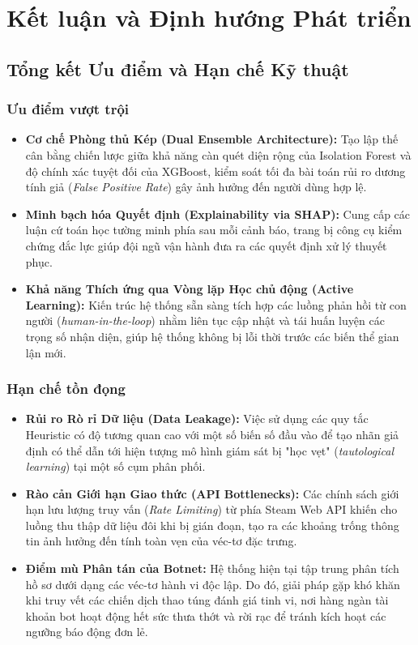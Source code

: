 \section{Kết luận và Định hướng Phát triển}

\subsection{Tổng kết Ưu điểm và Hạn chế Kỹ thuật}

\subsubsection{Ưu điểm vượt trội}
\begin{itemize}
    \item \textbf{Cơ chế Phòng thủ Kép (Dual Ensemble Architecture):} Tạo lập thế cân bằng chiến lược giữa khả năng càn quét diện rộng của Isolation Forest và độ chính xác tuyệt đối của XGBoost, kiểm soát tối đa bài toán rủi ro dương tính giả (\textit{False Positive Rate}) gây ảnh hưởng đến người dùng hợp lệ.
    \item \textbf{Minh bạch hóa Quyết định (Explainability via SHAP):} Cung cấp các luận cứ toán học tường minh phía sau mỗi cảnh báo, trang bị công cụ kiểm chứng đắc lực giúp đội ngũ vận hành đưa ra các quyết định xử lý thuyết phục.
    \item \textbf{Khả năng Thích ứng qua Vòng lặp Học chủ động (Active Learning):} Kiến trúc hệ thống sẵn sàng tích hợp các luồng phản hồi từ con người (\textit{human-in-the-loop}) nhằm liên tục cập nhật và tái huấn luyện các trọng số nhận diện, giúp hệ thống không bị lỗi thời trước các biến thể gian lận mới.
\end{itemize}

\subsubsection{Hạn chế tồn đọng}
\begin{itemize}
    \item \textbf{Rủi ro Rò rỉ Dữ liệu (Data Leakage):} Việc sử dụng các quy tắc Heuristic có độ tương quan cao với một số biến số đầu vào để tạo nhãn giả định có thể dẫn tới hiện tượng mô hình giám sát bị "học vẹt" (\textit{tautological learning}) tại một số cụm phân phối.
    \item \textbf{Rào cản Giới hạn Giao thức (API Bottlenecks):} Các chính sách giới hạn lưu lượng truy vấn (\textit{Rate Limiting}) từ phía Steam Web API khiến cho luồng thu thập dữ liệu đôi khi bị gián đoạn, tạo ra các khoảng trống thông tin ảnh hưởng đến tính toàn vẹn của véc-tơ đặc trưng.
    \item \textbf{Điểm mù Phân tán của Botnet:} Hệ thống hiện tại tập trung phân tích hồ sơ dưới dạng các véc-tơ hành vi độc lập. Do đó, giải pháp gặp khó khăn khi truy vết các chiến dịch thao túng đánh giá tinh vi, nơi hàng ngàn tài khoản bot hoạt động hết sức thưa thớt và rời rạc để tránh kích hoạt các ngưỡng báo động đơn lẻ.
\end{itemize}

